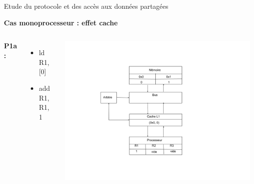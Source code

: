 \documentclass{beamer}
\begin{document}
\begin{frame}{Etude du protocole et des accès aux données partagées}
    \addtocounter{framenumber}{-1}
    \textbf{Cas monoprocesseur : effet cache}
    \begin{columns}[c] %

        \textbf{P1a : }
        \begin{itemize}
            \item ld R1, [0]
            \item add R1, R1, 1
        \end{itemize}

        \includegraphics[scale=0.28]{f2.png}
        
    \end{columns}
\end{frame}
\end{document}
